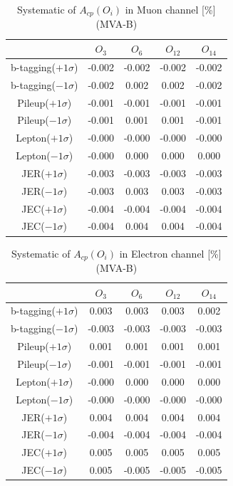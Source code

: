 		\begin{center}
		\setlength{\tabcolsep}{12pt}
		\begin{longtable}{ | c | c c c c | }
		\caption{Systematic of $A_{cp}(O_i)$ in Muon channel [\%] (MVA-B)}\\
		\hline
		 [\%] & $O_3$ & $O_6$ & $O_{12}$ & $O_{14}$ \\
		\hline
		b-tagging($+1\sigma$) & -0.002 & -0.002 & -0.002 & -0.002 \\
		b-tagging($-1\sigma$) & -0.002 & 0.002 & 0.002 & -0.002 \\
		\hline
		Pileup($+1\sigma$) & -0.001 & -0.001 & -0.001 & -0.001 \\
		Pileup($-1\sigma$) & -0.001 & 0.001 & 0.001 & -0.001 \\
		\hline
		Lepton($+1\sigma$) & -0.000 & -0.000 & -0.000 & -0.000 \\
		Lepton($-1\sigma$) & -0.000 & 0.000 & 0.000 & 0.000 \\
		\hline
		JER($+1\sigma$) & -0.003 & -0.003 & -0.003 & -0.003 \\
		JER($-1\sigma$) & -0.003 & 0.003 & 0.003 & -0.003 \\
		\hline
		JEC($+1\sigma$) & -0.004 & -0.004 & -0.004 & -0.004 \\
		JEC($-1\sigma$) & -0.004 & 0.004 & 0.004 & -0.004 \\
		\hline
		\end{longtable}
		\end{center}

		\begin{center}
		\setlength{\tabcolsep}{12pt}
		\begin{longtable}{ | c | c c c c | }
		\caption{Systematic of $A_{cp}(O_i)$ in Electron channel [\%] (MVA-B)}\\
		\hline
		 [\%] & $O_3$ & $O_6$ & $O_{12}$ & $O_{14}$ \\
		\hline
		b-tagging($+1\sigma$) & 0.003 & 0.003 & 0.003 & 0.002 \\
		b-tagging($-1\sigma$) & -0.003 & -0.003 & -0.003 & -0.003 \\
		\hline
		Pileup($+1\sigma$) & 0.001 & 0.001 & 0.001 & 0.001 \\
		Pileup($-1\sigma$) & -0.001 & -0.001 & -0.001 & -0.001 \\
		\hline
		Lepton($+1\sigma$) & -0.000 & 0.000 & 0.000 & 0.000 \\
		Lepton($-1\sigma$) & -0.000 & -0.000 & -0.000 & -0.000 \\
		\hline
		JER($+1\sigma$) & 0.004 & 0.004 & 0.004 & 0.004 \\
		JER($-1\sigma$) & -0.004 & -0.004 & -0.004 & -0.004 \\
		\hline
		JEC($+1\sigma$) & 0.005 & 0.005 & 0.005 & 0.005 \\
		JEC($-1\sigma$) & 0.005 & -0.005 & -0.005 & -0.005 \\
		\hline
		\end{longtable}
		\end{center}

\FloatBarrier
